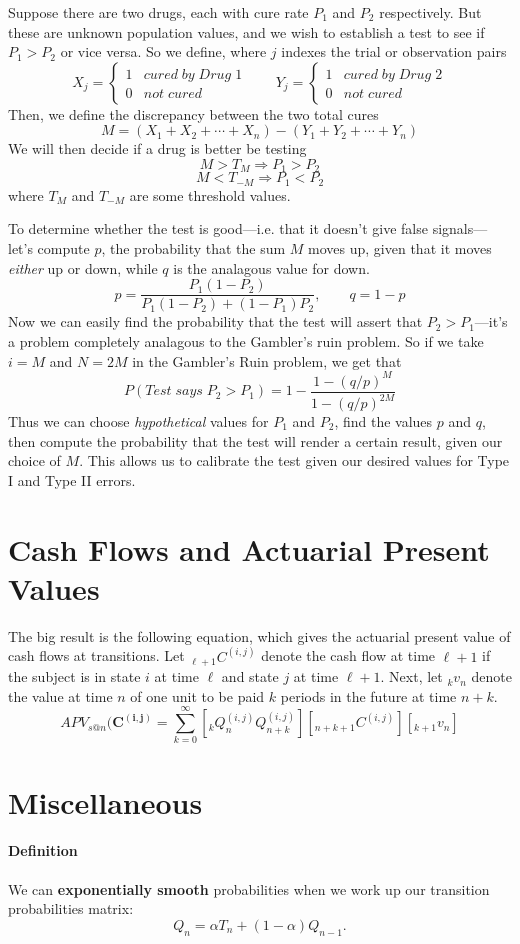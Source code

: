 \documentclass[a4paper,12pt]{scrartcl}
\begin{document}
Suppose there are two drugs, each with cure rate $P_1$ and $P_2$ 
respectively. But these are unknown population values, and 
we wish to establish a test to see if $P_1 > P_2$ or vice versa.
So we define, where $j$ indexes the trial
or observation pairs
   \[ X_j = \begin{cases} 1 & cured\;by\; Drug\; 1 
	 \\ 0 & not \; cured \end{cases}
      \qquad 
      Y_j = \begin{cases} 1 & cured\;by\; Drug\; 2 
	 \\ 0 & not \; cured \end{cases}
      \]
Then, we define the discrepancy between the two total cures
   \[ M = (X_1 + X_2 + \cdots + X_n) - (Y_1 + Y_2 + \cdots + Y_n) \]
We will then decide if a drug is better be testing
   \[ M > T_M \Rightarrow P_1 > P_2 \]
   \[ M < T_{-M} \Rightarrow P_1 < P_2 \]
where $T_M$ and $T_{-M}$ are some threshold values.

To determine whether the test is good---i.e. that it doesn't give
false signals---let's compute $p$, the probability that the sum $M$
moves up, given that it moves \emph{either} up or down, while $q$
is the analagous value for down.
   \[ p = \frac{P_1(1-P_2)}{P_1(1-P_2) + (1-P_1) P_2 }, 
      \qquad q = 1-p \]
Now we can easily find the probability that the test will assert that
$P_2>P_1$---it's a problem completely analagous to the Gambler's ruin
problem.
So if we take $i = M$ and $N = 2M$ in the Gambler's Ruin problem, 
we get that 
   \[ P( Test \; says \; P_2 > P_1) = 1 - \frac{1 - (q/p)^M}{1 - 
      (q/p)^{2M}} \]
Thus we can choose \emph{hypothetical} values for $P_1$ and $P_2$, find
the values $p$ and $q$, then compute the probability that the test
will render a certain result, given our choice of $M$. This allows
us to calibrate the test given our desired values for Type I and 
Type II errors.


\section{Cash Flows and Actuarial Present Values}

The big result is the following equation, which gives the actuarial 
present value of cash flows at transitions. Let 
${}_{\ell + 1}C^{(i,j)}$ denote the cash flow at time $\ell+1$ if the 
subject is in state $i$ at time $\ell$ and state $j$ at time $\ell + 1$.
Next, let ${}_kv_n$ denote the value at time $n$ of one unit to be
paid $k$ periods in the future at time $n+k$.
\[APV_{s@n}(\mathbf{C^{(i,j)}} = \sum_{k=0}^{\infty} 
   \left[ {}_kQ_n^{(i,j)} Q_{n+k}^{(i,j)} \right] \left[
   {}_{n+k+1}C^{(i,j)} \right] \left[{}_{k+1}v_n\right]	 \]








\section{Miscellaneous}

\paragraph{Definition} We can \textbf{exponentially smooth} probabilities
when we work up our transition probabilities matrix:
   \[ Q_n = \alpha T_n + (1-\alpha) Q_{n-1}.\]
\end{document}
